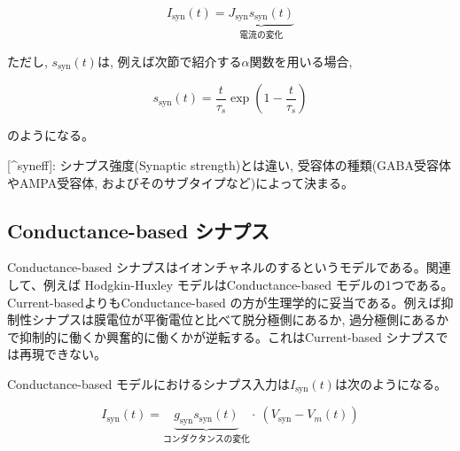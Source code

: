 \begin{equation}

I_{\text{syn}}(t)=\underbrace{J_{\text{syn}}s_{\text{syn}}(t)}_{電流の変化}    

\end{equation}





ただし, $s_{\text{syn}}(t)$は, 例えば次節で紹介する$\alpha$関数を用いる場合, 





\begin{equation}

s_{\text{syn}}(t)=\dfrac{t}{\tau_s} \exp \left(1-\dfrac{t}{\tau_s}\right)    

\end{equation}





のようになる。



[^syneff]: シナプス強度(Synaptic strength)とは違い, 受容体の種類(GABA受容体やAMPA受容体,  およびそのサブタイプなど)によって決まる。



\subsection{Conductance-based シナプス
}
Conductance-based シナプスはイオンチャネルの\textbf{}するというモデルである。関連して、例えば Hodgkin-Huxley モデルはConductance-based モデルの1つである。Current-basedよりもConductance-based の方が生理学的に妥当である。例えば抑制性シナプスは膜電位が平衡電位と比べて脱分極側にあるか, 過分極側にあるかで抑制的に働くか興奮的に働くかが逆転する。これはCurrent-based シナプスでは再現できない。



Conductance-based モデルにおけるシナプス入力は$I_{\text{syn}}(t)$は次のようになる。 





\begin{equation}

I_{\text{syn}}(t)=\underbrace{g_{\text{syn}}s_{\text{syn}}(t)}_{コンダクタンスの変化}\cdot\ \left(V_{\text{syn}}-V_{m}(t)\right)    

\end{equation}






